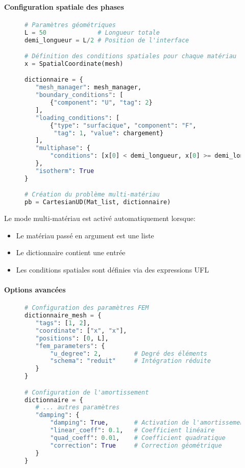 \documentclass[10pt]{book}
\begin{document}
\paragraph{Configuration spatiale des phases}

\begin{figure}[h!]
\begin{lstlisting}[language=python]
# Paramètres géométriques
L = 50              # Longueur totale
demi_longueur = L/2 # Position de l'interface

# Définition des conditions spatiales pour chaque matériau
x = SpatialCoordinate(mesh)

dictionnaire = {
   "mesh_manager": mesh_manager,
   "boundary_conditions": [
       {"component": "U", "tag": 2}
   ],
   "loading_conditions": [
       {"type": "surfacique", "component": "F", 
        "tag": 1, "value": chargement}
   ],
   "multiphase": {
       "conditions": [x[0] < demi_longueur, x[0] >= demi_longueur]
   },
   "isotherm": True
}

# Création du problème multi-matériau
pb = CartesianUD(Mat_list, dictionnaire)
\end{lstlisting}
\end{figure}

Le mode multi-matériau est activé automatiquement lorsque:
\begin{itemize}
\item Le matériau passé en argument est une liste
\item Le dictionnaire contient une entrée 
\item Les conditions spatiales sont définies via des expressions UFL
\end{itemize}

\paragraph{Options avancées}

\begin{figure}[h!]
\begin{lstlisting}[language=python]
# Configuration des paramètres FEM
dictionnaire_mesh = {
   "tags": [1, 2], 
   "coordinate": ["x", "x"], 
   "positions": [0, L],
   "fem_parameters": {
       "u_degree": 2,         # Degré des éléments
       "schema": "reduit"     # Intégration réduite
   }
}

# Configuration de l'amortissement
dictionnaire = {
   # ... autres paramètres
   "damping": {
       "damping": True,       # Activation de l'amortissement
       "linear_coeff": 0.1,   # Coefficient linéaire
       "quad_coeff": 0.01,    # Coefficient quadratique
       "correction": True     # Correction géométrique
   }
}
\end{lstlisting}
\end{figure}
\end{document}

